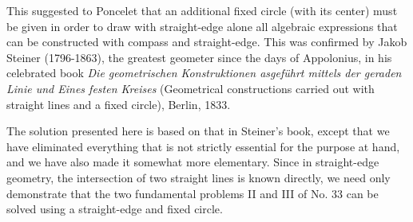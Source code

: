 \documentclass[11pt,a4paper]{article}
\begin{document}
This suggested to Poncelet that an additional fixed circle (with its center) must be given in order to draw with straight-edge alone all algebraic expressions that can be constructed with compass and straight-edge. This was confirmed by Jakob Steiner (1796-1863), the greatest geometer since the days of Appolonius, in his celebrated book \textit{Die geometrischen Konstruktionen asgef\"{u}hrt mittels der geraden Linie und Eines festen Kreises} (Geometrical constructions carried out with straight lines and a fixed circle), Berlin, 1833. 

The solution presented here is based on that in Steiner's book, except that we have eliminated everything that is not strictly essential for the purpose at hand, and we have also made it somewhat more elementary. Since in straight-edge geometry, the intersection of two straight lines is known directly, we need only demonstrate that the two fundamental problems II and III of No. 33 can be solved using a straight-edge and fixed circle. 
\end{document}
